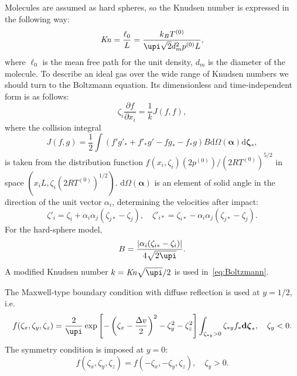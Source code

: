 \documentclass[]{jfm}
\newcommand{\Kn}{\mbox{\textit{Kn}}}
\newcommand{\dd}{\mathrm{d}}
\newcommand{\pder}[2][]{\frac{\partial#1}{\partial#2}}
\newcommand{\dzeta}{\boldsymbol{\dd\zeta}}
\begin{document}
Molecules are assumed as hard spheres, so the Knudsen number is expressed in the following way:
\begin{equation}\label{eq:Kn_number}
    \Kn = \frac{\ell_0}{L} = \frac{k_BT^{(0)}}{\upi\sqrt{2} d_m^2p^{(0)}L},
\end{equation}
where \(\ell_0\) is the mean free path for the unit density, \(d_m\) is the diameter of the molecule.
To describe an ideal gas over the wide range of Knudsen numbers
we should turn to the Boltzmann equation.
Its dimensionless and time-independent form is as follows:
\begin{equation}\label{eq:Boltzmann}
    \zeta_i\pder[f]{x_i} = \frac1k J(f,f),
\end{equation}
where the collision integral
\begin{equation}\label{eq:ci}
    J(f,g) = \frac12 \int (f'g'_* + f'_*g' - fg_* - f_*g) B
    \dd \Omega(\boldsymbol{\alpha}) \dzeta_*,
\end{equation}
is taken from the distribution function \(f(x_i,\zeta_i)(2p^{(0)})/(2RT^{(0)})^{5/2}\)
in space \((x_iL, \zeta_i(2RT^{(0)})^{1/2})\).
\(\dd \Omega(\boldsymbol{\alpha})\) is an element of solid angle in the direction of the unit vector \(\alpha_i\),
determining the velocities after impact:
\begin{equation}\label{eq:after_impact}
    \zeta'_i = \zeta_i + \alpha_i\alpha_j(\zeta_{j*}-\zeta_j), \quad
    \zeta'_{i*} = \zeta_{i*} - \alpha_i\alpha_j(\zeta_{j*}-\zeta_j).
\end{equation}
For the hard-sphere model,
\begin{equation}\label{eq:ci_kernel}
    B = \frac{|\alpha_i(\zeta_{i*}-\zeta_i)|}{4\sqrt{2\upi}}.
\end{equation}
A modified Knudsen number \(k = \Kn\sqrt{\upi}/2\) is used in~\eqref{eq:Boltzmann}.

The Maxwell-type boundary condition with diffuse reflection is used at \(y=1/2\), i.e.
\begin{equation}\label{eq:diffuse_bc}
    f(\zeta_x,\zeta_y,\zeta_z) = \frac2{\upi} \exp\left[-\left(\zeta_x-\frac{\Delta{v}}{2}\right)^2-\zeta_y^2-\zeta_z^2\right]
        \int_{\zeta_{*y}>0}\zeta_{*y} f_* \dzeta_*, \quad \zeta_y<0.
\end{equation}
The symmetry condition is imposed at \(y=0\):
\begin{equation}\label{eq:specular_bc}
    f(\zeta_x,\zeta_y,\zeta_z) = f(-\zeta_x,-\zeta_y,\zeta_z), \quad \zeta_y>0.
\end{equation}
\end{document}

